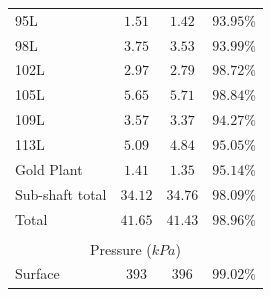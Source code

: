 \begin{appendices}
\begin{table}[h!]
\begin{tabular}{lccr}
		95L  & $ 1.51 $ & $ 1.42 $ & $ 93.95 $\% \\
		98L  & $ 3.75 $ & $ 3.53 $ & $ 93.99 $\% \\
		102L  & $ 2.97 $ & $ 2.79 $ & $ 98.72 $\% \\
		105L  & $ 5.65 $ & $ 5.71 $ & $ 98.84 $\% \\
		109L  & $ 3.57 $ & $ 3.37 $ & $ 94.27 $\% \\
		113L  & $ 5.09 $ & $ 4.84 $ & $ 95.05 $\% \\
		Gold Plant & $ 1.41 $ & $ 1.35 $ & $ 95.14 $\% \\
		Sub-shaft total & $ 34.12 $ & $ 34.76 $ & $ 98.09 $\% \\
		Total & $ 41.65$  & $41.43 $  & $ 98.96 $\% \\
		\\
		\multicolumn{4}{c}{Pressure ($ kPa $)}
		\\
		
		Surface & $ 393 $ & $ 396 $ & $ 99.02 $\% \\
		\hline 
	\end{tabular}
	
	\label{Table: B verification}
\end{table}


\end{appendices}
